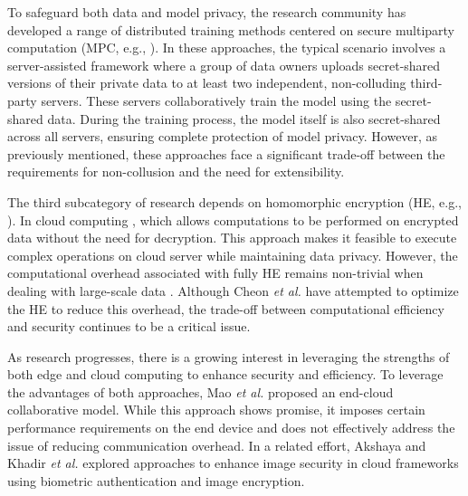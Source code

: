\documentclass[conference]{IEEEtran}
\begin{document}
To safeguard both data and model privacy, the research community has developed a range of distributed training methods centered on secure multiparty computation (MPC, e.g., \cite{7958569,Escudero2020ImprovedPF,Dalskov2020FantasticFH}). In these approaches, the typical scenario involves a server-assisted framework where a group of data owners uploads secret-shared versions of their private data to at least two independent, non-colluding third-party servers. These servers collaboratively train the model using the secret-shared data. During the training process, the model itself is also secret-shared across all servers, ensuring complete protection of model privacy. However, as previously mentioned, these approaches face a significant trade-off between the requirements for non-collusion and the need for extensibility.

The third subcategory of research depends on homomorphic encryption (HE, e.g., \cite{Nandakumar2019TowardsDN, CiC-1-2-22,9888863, zhao2023identifiable}). In cloud computing \cite{gentry2009fully}, which allows computations to be performed on encrypted data without the need for decryption. This approach makes it feasible to execute complex operations on cloud server while maintaining data privacy. However, the computational overhead associated with fully HE remains non-trivial when dealing with large-scale data \cite{xu2019cryptonn}. Although Cheon \textit{et al.} \cite{cheon2017homomorphic} have attempted to optimize the HE to reduce this overhead, the trade-off between computational efficiency and security continues to be a critical issue.

As research progresses, there is a growing interest in leveraging the strengths of both edge and cloud computing to enhance security and efficiency. To leverage the advantages of both approaches, Mao \textit{et al.} \cite{mao2017survey} proposed an end-cloud collaborative model. While this approach shows promise, it imposes certain performance requirements on the end device and does not effectively address the issue of reducing communication overhead. In a related effort, Akshaya and Khadir \textit{et al.} \cite{kakkad2019biometric} explored approaches to enhance image security in cloud frameworks using biometric authentication and image encryption.

\end{document}
